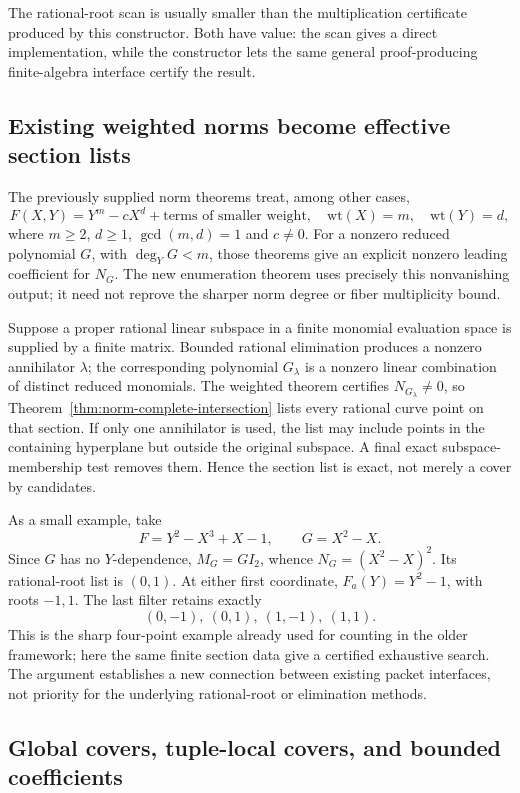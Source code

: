 The rational-root scan is usually smaller than the multiplication
certificate produced by this constructor.  Both have value: the scan
gives a direct implementation, while the constructor lets the same
general proof-producing finite-algebra interface certify the result.

\subsection{Existing weighted norms become effective section lists}

The previously supplied norm theorems treat, among other cases,
\[
 F(X,Y)=Y^m-cX^d+\text{terms of smaller weight},
 \quad \mathrm{wt}(X)=m,\quad\mathrm{wt}(Y)=d,
\]
where \(m\ge2\), \(d\ge1\), \(\gcd(m,d)=1\) and \(c\ne0\).
For a nonzero reduced polynomial \(G\), with \(\deg_YG<m\), those
theorems give an explicit nonzero leading coefficient for \(N_G\).
The new enumeration theorem uses precisely this nonvanishing output;
it need not reprove the sharper norm degree or fiber multiplicity bound.

Suppose a proper rational linear subspace in a finite monomial
evaluation space is supplied by a finite matrix.  Bounded rational
elimination produces a nonzero annihilator \(\lambda\); the
corresponding polynomial \(G_\lambda\) is a nonzero linear
combination of distinct reduced monomials.  The weighted theorem
certifies \(N_{G_\lambda}\ne0\), so
Theorem~\ref{thm:norm-complete-intersection} lists every rational
curve point on that section.  If only one annihilator is used, the
list may include points in the containing hyperplane but outside
the original subspace.  A final exact subspace-membership test
removes them.  Hence the section list is exact, not merely a cover
by candidates.

As a small example, take
\[
 F=Y^2-X^3+X-1,\qquad G=X^2-X.
\]
Since \(G\) has no \(Y\)-dependence, \(M_G=G I_2\), whence
\(N_G=(X^2-X)^2\).  Its rational-root list is \((0,1)\).
At either first coordinate, \(F_a(Y)=Y^2-1\), with roots
\(-1,1\).  The last filter retains exactly
\[
 (0,-1),\ (0,1),\ (1,-1),\ (1,1).
\]
This is the sharp four-point example already used for counting in
the older framework; here the same finite section data give a
certified exhaustive search.  The argument establishes a new
connection between existing packet interfaces, not priority for
the underlying rational-root or elimination methods.

\subsection{Global covers, tuple-local covers, and bounded coefficients}

